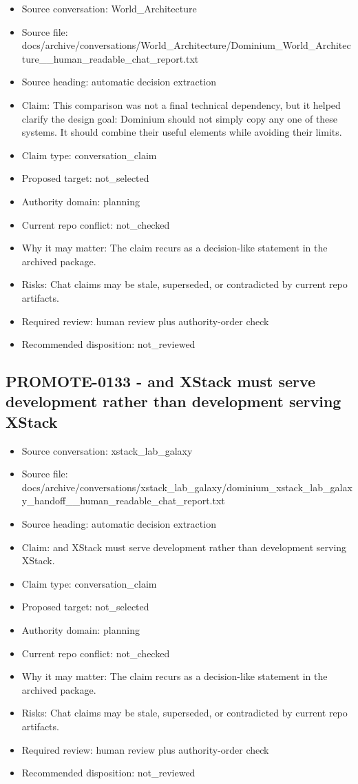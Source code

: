 \documentclass[11pt,a4paper]{report}
\begin{document}
\begin{itemize}
\item Source conversation: World\_Architecture
\item Source file: docs/archive/conversations/World\_Architecture/Dominium\_World\_Architecture\_\_human\_readable\_chat\_report.txt
\item Source heading: automatic decision extraction
\item Claim: This comparison was not a final technical dependency, but it helped clarify the design goal: Dominium should not simply copy any one of these systems. It should combine their useful elements while avoiding their limits.
\item Claim type: conversation\_claim
\item Proposed target: not\_selected
\item Authority domain: planning
\item Current repo conflict: not\_checked
\item Why it may matter: The claim recurs as a decision-like statement in the archived package.
\item Risks: Chat claims may be stale, superseded, or contradicted by current repo artifacts.
\item Required review: human review plus authority-order check
\item Recommended disposition: not\_reviewed
\end{itemize}

\subsection{PROMOTE-0133 - and XStack must serve development rather than development serving XStack}

\begin{itemize}
\item Source conversation: xstack\_lab\_galaxy
\item Source file: docs/archive/conversations/xstack\_lab\_galaxy/dominium\_xstack\_lab\_galaxy\_handoff\_\_human\_readable\_chat\_report.txt
\item Source heading: automatic decision extraction
\item Claim: and XStack must serve development rather than development serving XStack.
\item Claim type: conversation\_claim
\item Proposed target: not\_selected
\item Authority domain: planning
\item Current repo conflict: not\_checked
\item Why it may matter: The claim recurs as a decision-like statement in the archived package.
\item Risks: Chat claims may be stale, superseded, or contradicted by current repo artifacts.
\item Required review: human review plus authority-order check
\item Recommended disposition: not\_reviewed
\end{itemize}
\end{document}
